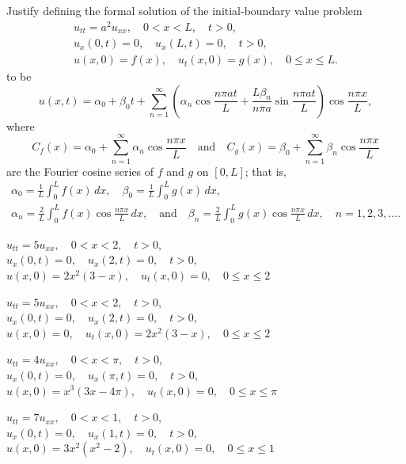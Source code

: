 \begin{exerciselist}
\item\label{exer:12.2.49}Justify  defining the formal solution of the initial-boundary
value problem
\begin{gather*}
u_{tt}=a^2u_{xx},\quad 0<x<L,\quad t>0,\\
 u_x(0,t)=0,\quad u_x(L,t)=0,\quad t>0,\\
u(x,0)=f(x),\quad u_t(x,0)=g(x),\quad 0\le x\le L.
\end{gather*}
to be
\[
u(x,t)=\alpha_0+\beta_0t+\sum_{n=1}^\infty
\left(\alpha_n\cos\frac{n\pi at}{L}+\frac{L\beta_n}{n\pi
a}\sin\frac{n\pi at}{L}\right)
\cos\frac{n\pi x}{L},
\]
where
\[
C_f(x)=\alpha_0+\sum_{n=1}^\infty\alpha_n\cos\frac{n\pi x}{L}
\quad\text{and}\quad
C_g(x)=\beta_0+\sum_{n=1}^\infty\beta_n\cos\frac{n\pi x}{L}
\]
are the Fourier cosine series of $f$ and $g$
on $[0,L]$; that is,
\begin{gather*}
\alpha_0=\frac{1}{L}\int_0^Lf(x)\,dx,\quad
\beta_0=\frac{1}{L}\int_0^Lg(x)\,dx,\\
\alpha_n=\frac{2}{L}\int_0^Lf(x)\cos\frac{n\pi x}{L}\,dx,
\quad\text{and}\quad
\beta_n=\frac{2}{L}\int_0^Lg(x)\cos\frac{n\pi x}{L}\,dx,\quad
n=1,2,3,\dots.
\end{gather*}



\item\label{exer:12.2.50}$u_{tt}=5u_{xx},\quad 0<x<2,\quad t>0$,\\
$u_x(0,t)=0,\quad u_x(2,t)=0,\quad t>0$,\\
$u(x,0)=2x^2(3-x),\quad u_t(x,0)=0,\quad0\le x\le 2$


\item\label{exer:12.2.51}$u_{tt}=5u_{xx},\quad 0<x<2,\quad t>0$,\\
$u_x(0,t)=0,\quad u_x(2,t)=0,\quad t>0$,\\
$u(x,0)=0,\quad u_t(x,0)=2x^2(3-x),\quad0\le x\le 2$

\item\label{exer:12.2.52}$u_{tt}=4u_{xx},\quad 0<x<\pi,\quad t>0$,\\
$u_x(0,t)=0,\quad u_x(\pi,t)=0,\quad t>0$,\\
$u(x,0)=x^3(3x-4\pi),\quad u_t(x,0)=0,\quad0\le x\le \pi$


\item\label{exer:12.2.53}$u_{tt}=7u_{xx},\quad 0<x<1,\quad t>0$,\\
$u_x(0,t)=0,\quad u_x(1,t)=0,\quad t>0$,\\
$u(x,0)=3x^2(x^2-2),\quad u_t(x,0)=0,\quad0\le x\le 1$


\end{exerciselist}
